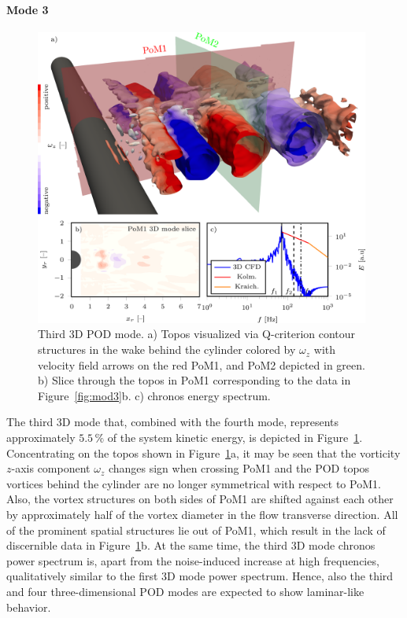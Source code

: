 {{\paragraph{Mode 3}
\begin{figure}[htbp]
    \centering
    \includegraphics[width=0.98\textwidth]{02_images/00_export/figure20.png}
    \caption{{Third 3D POD mode. a)} Topos {visualized via} Q-criterion contour structures in the wake behind the cylinder colored by $\omega_z$ with velocity field arrows on the red PoM1, and PoM2 depicted in green. {b) Slice through the topos in PoM1 corresponding to the data in Figure~\ref{fig:mod3}b. c) chronos energy spectrum.}}
    \label{fig:3Dmod3}
\end{figure}
The third 3D mode that, combined with the fourth mode, represents approximately $5.5\,\%$ of the system kinetic energy, is depicted in Figure~\ref{fig:3Dmod3}. {Concentrating on the topos shown in Figure~\ref{fig:3Dmod3}a, it may be seen that }{the vorticity $z$-axis component $\omega_{z}$ changes sign when crossing PoM1 and the} {POD topos} vortices behind the cylinder {are no longer symmetrical with respect to PoM1}. {Also, the vortex structures on both sides of PoM1 are shifted against each other by approximately half of the vortex diameter in the {flow transverse} direction. All of the prominent spatial structures lie out of PoM1, which result in the lack of discernible data in Figure~\ref{fig:3Dmod3}b.} {At the same time, the third 3D mode chronos power spectrum is, apart from the noise-induced increase at high frequencies, qualitatively similar to the first 3D mode power spectrum. Hence, also the third and four three-dimensional POD modes are expected to show laminar-like behavior.}

}}
